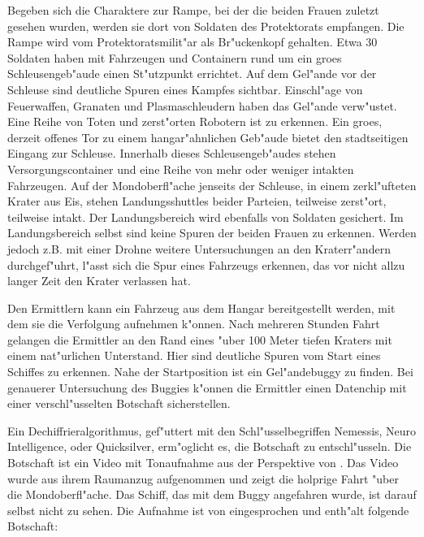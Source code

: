 Begeben sich die Charaktere zur Rampe, bei der die beiden Frauen zuletzt gesehen wurden, werden sie dort von Soldaten des Protektorats empfangen. Die Rampe wird vom Protektoratsmilit"ar als Br"uckenkopf gehalten. Etwa 30 Soldaten haben mit Fahrzeugen und Containern rund um ein gro\3es Schleusengeb"aude einen St"utzpunkt errichtet. Auf dem Gel"ande vor der Schleuse sind deutliche Spuren eines Kampfes sichtbar. Einschl"age von Feuerwaffen, Granaten und Plasmaschleudern haben das Gel"ande verw"ustet. Eine Reihe von Toten und zerst"orten Robotern ist zu erkennen. Ein gro\3es, derzeit offenes Tor zu einem hangar"ahnlichen Geb"aude bietet den stadtseitigen Eingang zur Schleuse. Innerhalb dieses Schleusengeb"audes stehen Versorgungscontainer und eine Reihe von mehr oder weniger intakten Fahrzeugen. Auf der Mondoberfl"ache jenseits der Schleuse, in einem zerkl"ufteten Krater aus Eis, stehen Landungsshuttles beider Parteien, teilweise zerst"ort, teilweise intakt. Der Landungsbereich wird ebenfalls von Soldaten gesichert. Im Landungsbereich selbst sind keine Spuren der beiden Frauen zu erkennen. Werden jedoch z.B. mit einer Drohne weitere Untersuchungen an den Kraterr"andern durchgef"uhrt, l"asst sich die Spur eines Fahrzeugs erkennen, das vor nicht allzu langer Zeit den Krater verlassen hat.

Den Ermittlern kann ein Fahrzeug aus dem Hangar bereitgestellt werden, mit dem sie die Verfolgung aufnehmen k"onnen. Nach mehreren Stunden Fahrt gelangen die Ermittler an den Rand eines "uber 100 Meter tiefen Kraters mit einem nat"urlichen Unterstand. Hier sind deutliche Spuren vom Start eines Schiffes zu erkennen. Nahe der Startposition ist ein Gel"andebuggy zu finden. Bei genauerer Untersuchung des Buggies k"onnen die Ermittler einen Datenchip mit einer verschl"usselten Botschaft sicherstellen.

Ein Dechiffrieralgorithmus, gef"uttert mit den Schl"usselbegriffen Nemessis, Neuro Intelligence, \xl{} oder Quicksilver, erm"oglicht es, die Botschaft zu entschl"usseln. Die Botschaft ist ein Video mit Tonaufnahme aus der Perspektive von \ml{}. Das Video wurde aus ihrem Raumanzug aufgenommen und zeigt die holprige Fahrt "uber die Mondoberfl"ache. Das Schiff, das mit dem Buggy angefahren wurde, ist darauf selbst nicht zu sehen. Die Aufnahme ist von \ml{} eingesprochen und enth"alt folgende Botschaft:

\vfill

